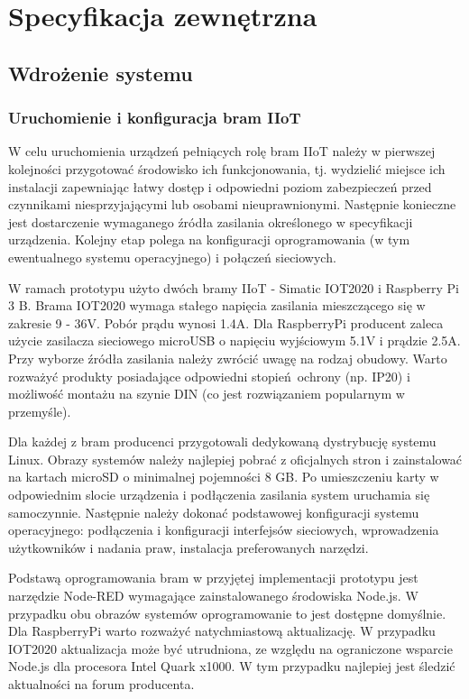 \documentclass[a4paper, 12pt, twoside]{article}
\begin{document}
\clearpage

\section{Specyfikacja zewnętrzna}\label{spec-zew}

\subsection{Wdrożenie systemu}

\subsubsection{Uruchomienie i konfiguracja bram IIoT}

W celu uruchomienia urządzeń pełniących rolę bram IIoT należy w pierwszej
kolejności przygotować środowisko ich funkcjonowania, tj. wydzielić
miejsce ich instalacji zapewniając łatwy dostęp i odpowiedni poziom zabezpieczeń
przed czynnikami niesprzyjającymi lub osobami nieuprawnionymi. Następnie
konieczne jest dostarczenie wymaganego źródła zasilania określonego
w specyfikacji urządzenia. Kolejny etap polega na konfiguracji oprogramowania
(w tym ewentualnego systemu operacyjnego) i połączeń sieciowych.

W ramach prototypu użyto dwóch bramy IIoT - Simatic IOT2020 i Raspberry Pi 3 B.
Brama IOT2020 wymaga stałego napięcia zasilania mieszczącego się w zakresie 9 - 36V.
Pobór prądu wynosi 1.4A. Dla RaspberryPi producent zaleca użycie
zasilacza sieciowego microUSB o napięciu wyjściowym 5.1V i prądzie 2.5A.
Przy wyborze źródła zasilania należy zwrócić uwagę na rodzaj obudowy. Warto
rozważyć produkty posiadające odpowiedni stopień ochrony (np. IP20) i możliwość
montażu na szynie DIN (co jest rozwiązaniem popularnym w przemyśle).

Dla każdej z bram producenci przygotowali dedykowaną dystrybucję systemu Linux.
Obrazy systemów należy najlepiej pobrać z oficjalnych stron i zainstalować na kartach
microSD o minimalnej pojemności 8 GB. Po umieszczeniu karty w odpowiednim
slocie urządzenia i podłączenia zasilania system uruchamia się samoczynnie.
Następnie należy dokonać podstawowej konfiguracji systemu operacyjnego: podłączenia i konfiguracji interfejsów sieciowych,
wprowadzenia użytkowników i nadania praw, instalacja preferowanych narzędzi.

Podstawą oprogramowania bram w przyjętej implementacji prototypu jest
narzędzie Node-RED wymagające zainstalowanego środowiska Node.js. W przypadku
obu obrazów systemów oprogramowanie to jest dostępne domyślnie. Dla RaspberryPi
warto rozważyć natychmiastową aktualizację. W przypadku IOT2020 aktualizacja
może być utrudniona, ze względu na ograniczone wsparcie Node.js dla procesora
Intel Quark x1000. W tym przypadku najlepiej jest śledzić aktualności na
forum producenta.
\end{document}
